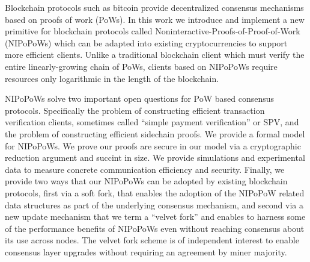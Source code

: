 Blockchain protocols such as bitcoin provide decentralized consensus
mechanisms based on proofs of work (PoWs).
%
In this work we introduce and implement a new primitive for blockchain protocols called Noninteractive-Proofs-of-Proof-of-Work (NIPoPoWs) which can be adapted into existing cryptocurrencies to support more efficient clients.
Unlike a traditional blockchain client which must verify the entire
linearly-growing chain of PoWs, clients based on NIPoPoWs require resources
only logarithmic in the length of the blockchain.

NIPoPoWs solve two important open questions for PoW based consensus
protocols. Specifically the problem  
of constructing efficient transaction verification clients, sometimes called
``simple payment verification'' or SPV, and the problem of constructing
efficient sidechain proofs. 
%
%
We provide a formal model for NIPoPoWs. We prove our proofs are secure in our
model via a cryptographic reduction argument and succint in size. We provide
simulations and experimental data to measure concrete communication efficiency
and security. 
Finally, we provide two ways that our NIPoPoWs can be adopted by
existing blockchain protocols, first via a soft fork, that enables the 
adoption of the NIPoPoW related data structures
as part of the underlying consensus mechanism, 
and second via a new update mechanism 
that we term a ``velvet fork'' and enables to harness some of
the performance benefits of NIPoPoWs even without reaching consensus about its use
across nodes. The velvet fork scheme is of independent interest to enable
consensus layer upgrades without requiring an agreement by miner majority.


